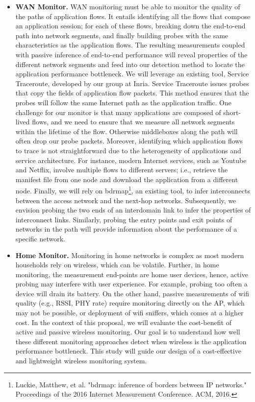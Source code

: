 \documentclass[11 pt]{article}
\begin{document}
\begin{itemize}
\item \textbf{WAN Monitor.} WAN monitoring must be able to monitor the quality of the paths of application flows. It entails identifying all the flows that compose an application session; for each of these flows, breaking down the end-to-end path into network segments, and finally building probes with the same characteristics as the application flows. The resulting measurements coupled with passive inference of end-to-end performance will reveal properties of the different network segments and feed into our detection method to locate the application performance bottleneck. We will leverage an existing tool, Service Traceroute, developed by our group at Inria. Service Traceroute issues probes that copy the fields of application flow packets. This method ensures that the probes will follow the same Internet path as the application traffic. One challenge for our monitor is that many applications are composed of short-lived flows, and we need to ensure that we measure all network segments within the lifetime of the flow. Otherwise middleboxes along the path will often drop our probe packets. Moreover, identifying which application flows to trace is not straightforward due to the heterogeneity of applications and service architecture. For instance, modern Internet services, such as Youtube and Netflix, involve multiple flows to different servers; i.e., retrieve the manifest file from one node and download the application from a different node. Finally, we will rely on bdrmap\footnote{Luckie, Matthew, et al. "bdrmap: inference of borders between IP networks." Proceedings of the 2016 Internet Measurement Conference. ACM, 2016.}, an existing tool, to infer interconnects between the access network and the next-hop networks. Subsequently, we envision probing the two ends of an interdomain link to infer the properties of interconnect links. Similarly, probing the entry points and exit points of networks in the path will provide information about the performance of a specific network.

\item \textbf{Home Monitor.} Monitoring in home networks is complex as most modern households rely on wireless, which can be volatile. Further, in home monitoring, the measurement end-points are home user devices, hence, active probing may interfere with user experience. For example, probing too often a device will drain its battery. On the other hand, passive measurements of wifi quality (e.g., RSSI, PHY rate) require monitoring directly on the AP, which may not be possible, or deployment of wifi sniffers, which comes at a higher cost. In the context of this proposal, we will evaluate the cost-benefit of active and passive wireless monitoring. Our goal is to understand how well these different monitoring approaches detect when wireless is the application performance bottleneck. This study will guide our design of a cost-effective and lightweight wireless monitoring system.


\end{itemize}
\end{document}
